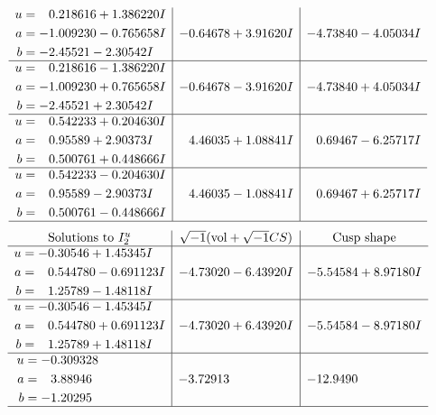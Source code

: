 \documentclass[1p]{elsarticle_modified}
\theoremstyle{definition}
\newcommand{\I}{\sqrt{-1}}
\begin{document}
$$\begin{array}{c|c|c}
\begin{aligned}
u &= \phantom{-}0.218616 + 1.386220 I \\
a &= -1.009230 - 0.765658 I \\
b &= -2.45521 - 2.30542 I\end{aligned}
 & -0.64678 + 3.91620 I & -4.73840 - 4.05034 I \\ \hline\begin{aligned}
u &= \phantom{-}0.218616 - 1.386220 I \\
a &= -1.009230 + 0.765658 I \\
b &= -2.45521 + 2.30542 I\end{aligned}
 & -0.64678 - 3.91620 I & -4.73840 + 4.05034 I \\ \hline\begin{aligned}
u &= \phantom{-}0.542233 + 0.204630 I \\
a &= \phantom{-}0.95589 + 2.90373 I \\
b &= \phantom{-}0.500761 + 0.448666 I\end{aligned}
 & \phantom{-}4.46035 + 1.08841 I & \phantom{-}0.69467 - 6.25717 I \\ \hline\begin{aligned}
u &= \phantom{-}0.542233 - 0.204630 I \\
a &= \phantom{-}0.95589 - 2.90373 I \\
b &= \phantom{-}0.500761 - 0.448666 I\end{aligned}
 & \phantom{-}4.46035 - 1.08841 I & \phantom{-}0.69467 + 6.25717 I\\
 \hline 
 \end{array}$$\newpage$$\begin{array}{c|c|c}  
\text{Solutions to }I^u_{2}& \I (\text{vol} + \sqrt{-1}CS) & \text{Cusp shape}\\
 \hline 
\begin{aligned}
u &= -0.30546 + 1.45345 I \\
a &= \phantom{-}0.544780 - 0.691123 I \\
b &= \phantom{-}1.25789 - 1.48118 I\end{aligned}
 & -4.73020 - 6.43920 I & -5.54584 + 8.97180 I \\ \hline\begin{aligned}
u &= -0.30546 - 1.45345 I \\
a &= \phantom{-}0.544780 + 0.691123 I \\
b &= \phantom{-}1.25789 + 1.48118 I\end{aligned}
 & -4.73020 + 6.43920 I & -5.54584 - 8.97180 I \\ \hline\begin{aligned}
u &= -0.309328\phantom{ +0.000000I} \\
a &= \phantom{-}3.88946\phantom{ +0.000000I} \\
b &= -1.20295\phantom{ +0.000000I}\end{aligned}
 & -3.72913\phantom{ +0.000000I} & -12.9490\phantom{ +0.000000I}\\
 \hline 
 \end{array}$$\newpage\newpage\renewcommand{\arraystretch}{1}
\end{document}
